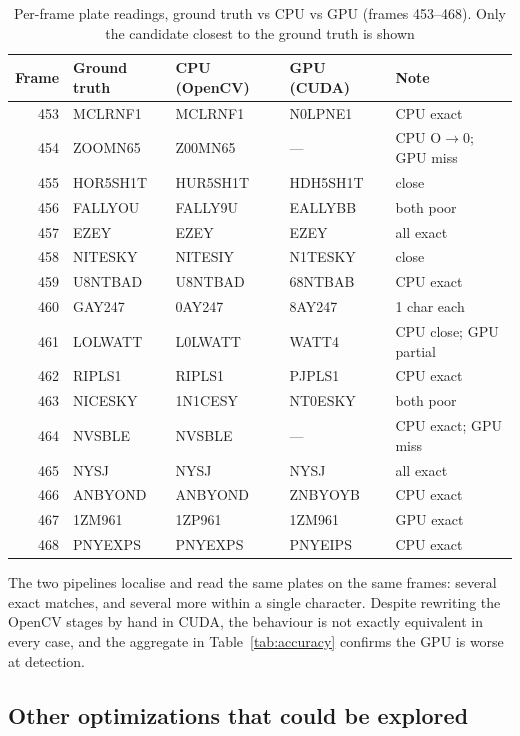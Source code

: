 \begin{table}[H]
\centering
\small
\begin{tabular}{rllll}
\toprule
Frame & Ground truth & CPU (OpenCV) & GPU (CUDA) & Note \\
\midrule
453 & MCLRNF1  & MCLRNF1  & N0LPNE1  & CPU exact \\
454 & ZOOMN65  & Z00MN65  & ---      & CPU O$\to$0; GPU miss \\
455 & HOR5SH1T & HUR5SH1T & HDH5SH1T & close \\
456 & FALLYOU  & FALLY9U  & EALLYBB  & both poor \\
457 & EZEY     & EZEY     & EZEY     & all exact \\
458 & NITESKY  & NITESIY  & N1TESKY  & close \\
459 & U8NTBAD  & U8NTBAD  & 68NTBAB  & CPU exact \\
460 & GAY247   & 0AY247   & 8AY247   & 1 char each \\
461 & LOLWATT  & L0LWATT  & WATT4    & CPU close; GPU partial \\
462 & RIPLS1   & RIPLS1   & PJPLS1   & CPU exact \\
463 & NICESKY  & 1N1CESY  & NT0ESKY  & both poor \\
464 & NVSBLE   & NVSBLE   & ---      & CPU exact; GPU miss \\
465 & NYSJ     & NYSJ     & NYSJ     & all exact \\
466 & ANBYOND  & ANBYOND  & ZNBYOYB  & CPU exact \\
467 & 1ZM961   & 1ZP961   & 1ZM961   & GPU exact \\
468 & PNYEXPS  & PNYEXPS  & PNYEIPS  & CPU exact \\
\bottomrule
\end{tabular}
\normalsize
\caption{Per-frame plate readings, ground truth vs CPU vs GPU (frames 453--468). Only the candidate closest to the ground truth is shown}
\label{tab:correctness}
\end{table}

The two pipelines localise and read the same plates on the same frames: several exact matches, and several more within a single character.
Despite rewriting the OpenCV stages by hand in CUDA, the behaviour is not exactly equivalent in every case, and the aggregate in Table~\ref{tab:accuracy} confirms the GPU is worse at detection.

\subsection{Other optimizations that could be explored}
\label{sec:future}

